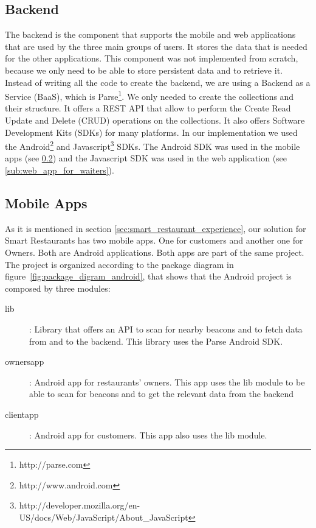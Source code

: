\subsection{Backend}
\label{sub:backend}
The backend is the component that supports the mobile and web applications
that are used by the three main groups of users. It stores the data that is
needed for the other applications. This component was not implemented from
scratch, because we only need to be able to store persistent data and to
retrieve it. Instead of writing all the code to create the backend, we
are using a Backend as a Service (BaaS), which is Parse\footnote{http://parse.com}.
We only needed to create the collections and their structure.
It offers a REST API\cite{restful} that allow to perform the
Create Read Update and Delete (CRUD) operations
on the collections.
It also offers Software Development Kits (SDKs) for many platforms.
In our implementation we used the
Android\footnote{http://www.android.com} and
Javascript\footnote{http://developer.mozilla.org/en-US/docs/Web/JavaScript/About\_JavaScript}
SDKs. The Android SDK was used in the mobile apps (see \ref{sub:mobile_apps})
and the Javascript SDK was used in the web application
(see \ref{sub:web_app_for_waiters}).

\subsection{Mobile Apps}
\label{sub:mobile_apps}
As it is mentioned in section \ref{sec:smart_restaurant_experience}, our
solution for Smart Restaurants has two mobile apps. One for customers and
another one for Owners. Both are Android applications. Both apps are
part of the same project. The project is organized according to the
package diagram in figure~\ref{fig:package_digram_android}, that shows
that the Android project is composed by three modules:
\begin{description}
  \item[lib]: Library that offers an API to scan for nearby beacons and
  to fetch data from and to the backend. This library uses the Parse Android
  SDK.
  \item[ownersapp]: Android app for restaurants' owners. This app uses
  the lib module to be able to scan for beacons and to get the relevant
  data from the backend
  \item[clientapp]: Android app for customers. This app also uses the lib
  module.
\end{description}

